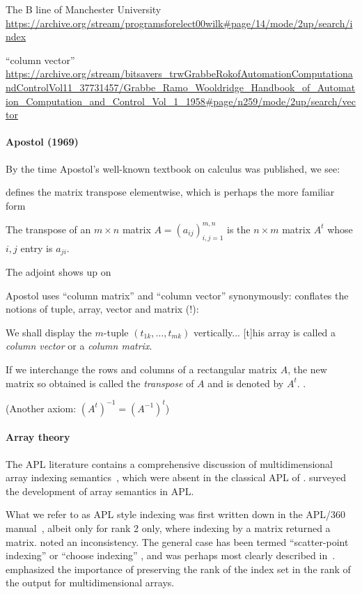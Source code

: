 The B line of Manchester University
\url{https://archive.org/stream/programsforelect00wilk#page/14/mode/2up/search/index}

“column vector”
\url{https://archive.org/stream/bitsavers_trwGrabbeRokofAutomationComputationandControlVol11_37731457/Grabbe_Ramo_Wooldridge_Handbook_of_Automation_Computation_and_Control_Vol_1_1958#page/n259/mode/2up/search/vector}


\paragraph{Apostol (1969)~\cite{Apostol1969}}

By the time Apostol's well-known textbook on calculus was published, we see:

\cite[p. 91]{Apostol1969} defines the matrix transpose elementwise, which is perhaps the more familiar form

The transpose of an $m \times n$ matrix
$A = {\left(a_{ij}\right)}^{m,n}_{i,j=1}$ is the $n \times m$ matrix $A^t$
whose $i, j$ entry is $a_{ji}$.

The adjoint shows up on \cite[p. 122]{Apostol1969}

Apostol uses ``column matrix'' and ``column vector'' synonymously: \cite[p. 592]{Apostol1967} conflates the notions of tuple, array, vector and matrix (!):

We shall display the $m$-tuple $(t_{1k}, \dots, t_{mk})$ vertically... [t]his array is called a \textit{column vector} or a \textit{column matrix}.

If we interchange the rows and columns of a rectangular matrix $A$, the new matrix so obtained is called the \textit{transpose} of $A$ and is denoted by $A^t$. \cite[p. 615, Exercise 7]{Apostol1967}.

(Another axiom: ${(A^t)}^{-1} = {(A^{-1})}^t$)

\paragraph{Array theory} The APL literature contains a comprehensive discussion
of multidimensional array indexing semantics~\cite{Brown1982}, which were
absent in the classical APL of \cite{Iverson1962}. \cite{Ruehr1982,Gerth1988}
surveyed the development of array semantics in APL.

What we refer to as APL style indexing was first written down in the APL/360
manual~\cite{Falkoff1968}, albeit only for rank 2 only, where indexing by a
matrix returned a matrix. \cite{Haegi1976} noted an inconsistency. The general
case has been termed ``scatter-point indexing'' or ``choose indexing''
\cite{Brown1972,Ruehr1982}, and was perhaps most clearly described
in~\cite{More1979}. \cite{Gull1979} emphasized the importance of preserving
the rank of the index set in the rank of the output for multidimensional
arrays.

